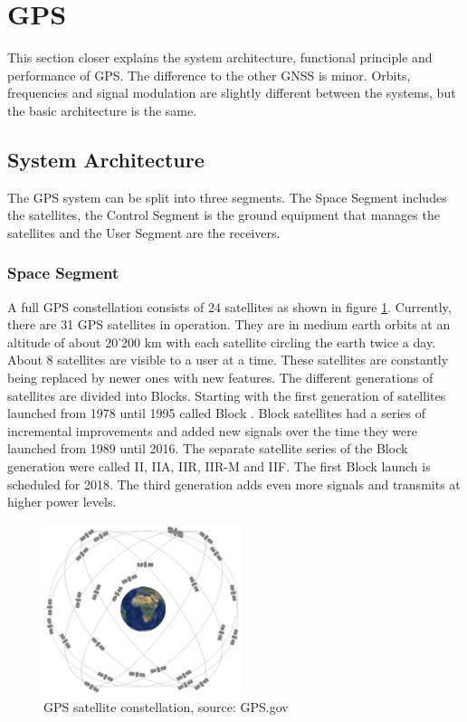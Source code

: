 \section{GPS}

This section closer explains the system architecture, functional principle and performance of GPS.
The difference to the other GNSS is minor.
Orbits, frequencies and signal modulation are slightly different between the systems, but the basic architecture is the same.


\subsection{System Architecture}

The GPS system can be split into three segments.
The Space Segment includes the satellites, the Control Segment is the ground equipment that manages the satellites and the User Segment are the receivers.

\subsubsection{Space Segment}

A full GPS constellation consists of 24 satellites as shown in figure \ref{fig:constellation}.
Currently, there are 31 GPS satellites in operation.
They are in medium earth orbits at an altitude of about 20'200 km with each satellite circling the earth twice a day.
About 8 satellites are visible to a user at a time.
These satellites are constantly being replaced by newer ones with new features.
The different generations of satellites are divided into Blocks.
Starting with the first generation of satellites launched from 1978 until 1995 called Block .
Block  satellites had a series of incremental improvements and added new signals over the time they were launched from 1989 until 2016.
The separate satellite series of the Block  generation were called II, IIA, IIR, IIR-M and IIF.
The first Block  launch is scheduled for 2018.
The third generation adds even more signals and transmits at higher power levels.

\begin{figure}[ht]
 \centering
 \includegraphics[height=5cm]{images/constellation.jpg}
 \caption{GPS satellite constellation, source: GPS.gov}
 \label{fig:constellation}
\end{figure}

